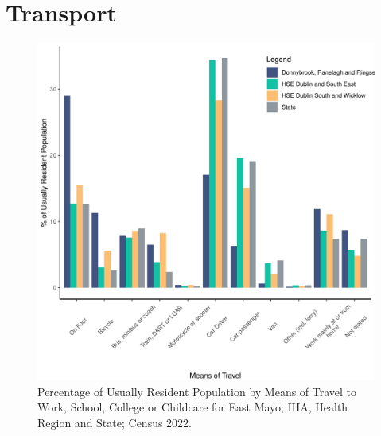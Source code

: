 \documentclass{article}
\begin{document}
\section{Transport}\label{sect:Trans}
\begin{figure}[H]
	\centering
	\includegraphics[width = 120mm]{../figures/TravelED.pdf}
	\caption{Percentage of Usually Resident Population by Means of Travel to Work, School, College or Childcare for East Mayo; IHA, Health Region and State; Census 2022.}
	\label{fig:vbnv}
	\end{figure}
\end{document}

